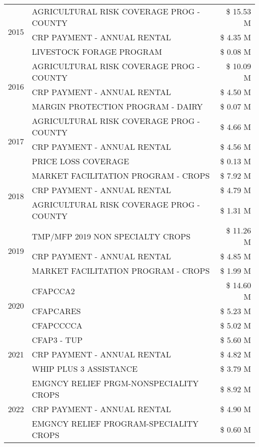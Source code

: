\begin{tabular}{llr}
\cline{1-3}
\multirow[t]{3}{*}{2015} & AGRICULTURAL RISK COVERAGE PROG - COUNTY & \$ 15.53 M \\
 & CRP PAYMENT - ANNUAL RENTAL & \$ 4.35 M \\
 & LIVESTOCK FORAGE PROGRAM & \$ 0.08 M \\
\cline{1-3}
\multirow[t]{3}{*}{2016} & AGRICULTURAL RISK COVERAGE PROG - COUNTY & \$ 10.09 M \\
 & CRP PAYMENT - ANNUAL RENTAL & \$ 4.50 M \\
 & MARGIN PROTECTION PROGRAM - DAIRY & \$ 0.07 M \\
\cline{1-3}
\multirow[t]{3}{*}{2017} & AGRICULTURAL RISK COVERAGE PROG - COUNTY & \$ 4.66 M \\
 & CRP PAYMENT - ANNUAL RENTAL & \$ 4.56 M \\
 & PRICE LOSS COVERAGE & \$ 0.13 M \\
\cline{1-3}
\multirow[t]{3}{*}{2018} & MARKET FACILITATION PROGRAM - CROPS & \$ 7.92 M \\
 & CRP PAYMENT - ANNUAL RENTAL & \$ 4.79 M \\
 & AGRICULTURAL RISK COVERAGE PROG - COUNTY & \$ 1.31 M \\
\cline{1-3}
\multirow[t]{3}{*}{2019} & TMP/MFP 2019 NON SPECIALTY CROPS & \$ 11.26 M \\
 & CRP PAYMENT - ANNUAL RENTAL & \$ 4.85 M \\
 & MARKET FACILITATION PROGRAM - CROPS & \$ 1.99 M \\
\cline{1-3}
\multirow[t]{3}{*}{2020} & CFAPCCA2 & \$ 14.60 M \\
 & CFAPCARES & \$ 5.23 M \\
 & CFAPCCCCA & \$ 5.02 M \\
\cline{1-3}
\multirow[t]{3}{*}{2021} & CFAP3 - TUP & \$ 5.60 M \\
 & CRP PAYMENT - ANNUAL RENTAL & \$ 4.82 M \\
 & WHIP PLUS 3 ASSISTANCE & \$ 3.79 M \\
\cline{1-3}
\multirow[t]{3}{*}{2022} & EMGNCY RELIEF PRGM-NONSPECIALITY CROPS & \$ 8.92 M \\
 & CRP PAYMENT - ANNUAL RENTAL & \$ 4.90 M \\
 & EMGNCY RELIEF PROGRAM-SPECIALITY CROPS & \$ 0.60 M \\
\cline{1-3}
\bottomrule
\end{tabular}
